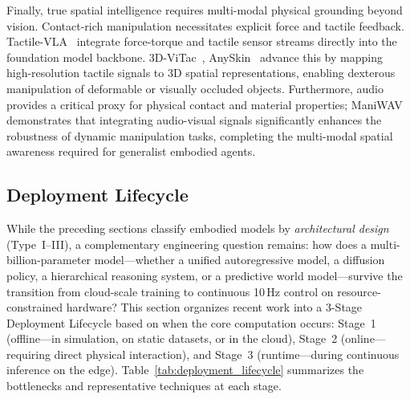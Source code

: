 \documentclass[acmsmall,screen,review,anonymous]{acmart}
\begin{document}
Finally, true spatial intelligence requires multi-modal physical grounding beyond vision. Contact-rich manipulation necessitates explicit force and tactile feedback. Tactile-VLA~\cite{huang2025tactilevla} integrate force-torque and tactile sensor streams directly into the foundation model backbone. 3D-ViTac~\cite{huang20253dvitac}, AnySkin~\cite{bhirangi2024anyskin} advance this by mapping high-resolution tactile signals to 3D spatial representations, enabling dexterous manipulation of deformable or visually occluded objects. Furthermore, audio provides a critical proxy for physical contact and material properties; ManiWAV~\cite{liu2024maniwav} demonstrates that integrating audio-visual signals significantly enhances the robustness of dynamic manipulation tasks, completing the multi-modal spatial awareness required for generalist embodied agents.

\subsection{Deployment Lifecycle}

While the preceding sections classify embodied models by \emph{architectural design} (Type~I--III), a complementary engineering question remains: how does a multi-billion-parameter model---whether a unified autoregressive model, a diffusion policy, a hierarchical reasoning system, or a predictive world model---survive the transition from cloud-scale training to continuous 10\,Hz control on resource-constrained hardware? This section organizes recent work into a 3-Stage Deployment Lifecycle based on when the core computation occurs: Stage~1 (offline---in simulation, on static datasets, or in the cloud), Stage~2 (online---requiring direct physical interaction), and Stage~3 (runtime---during continuous inference on the edge). Table~\ref{tab:deployment_lifecycle} summarizes the bottlenecks and representative techniques at each stage.
\end{document}
